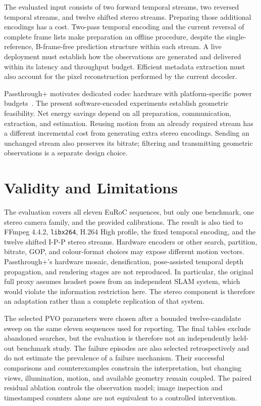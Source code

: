 The evaluated input consists of two forward temporal streams, two reversed
temporal streams, and twelve shifted stereo streams. Preparing those additional
encodings has a cost. Two-pass temporal encoding and the current reversal of
complete frame lists make preparation an offline procedure, despite the
single-reference, B-frame-free prediction structure within each stream.
A live deployment must establish how the observations are generated and
delivered within its latency and throughput budget. Efficient metadata
extraction must also account for the pixel reconstruction performed by the
current decoder.

Passthrough+ motivates dedicated codec hardware with platform-specific power
budgets~\cite{chaurasia2020passthrough}. The present software-encoded experiments
establish geometric feasibility. Net energy savings depend on all preparation,
communication, extraction, and estimation. Reusing motion from an already
required stream has a different incremental cost from generating extra stereo
encodings. Sending an unchanged stream also preserves its bitrate; filtering
and transmitting geometric observations is a separate design choice.

\section{Validity and Limitations}

The evaluation covers all eleven EuRoC sequences, but only one benchmark, one
stereo camera family, and the provided calibrations. The result is also tied to
FFmpeg 4.4.2, \texttt{libx264}, H.264 High profile, the fixed temporal encoding,
and the twelve shifted I-P-P stereo streams. Hardware encoders or other search,
partition, bitrate, GOP, and colour-format choices may expose different motion
vectors. Passthrough+'s hardware mosaic, densification, pose-assisted temporal
depth propagation, and rendering stages are not reproduced. In particular, the
original full proxy assumes headset poses from an independent SLAM system,
which would violate the information restriction here. The stereo component is
therefore an adaptation rather than a complete replication of that system.

The selected PVO parameters were chosen after a bounded twelve-candidate sweep
on the same eleven sequences used for reporting. The final tables exclude
abandoned searches, but the evaluation is therefore not an independently
held-out benchmark study. The failure episodes are also selected retrospectively
and do not estimate the prevalence of a failure mechanism. Their successful
comparisons and counterexamples constrain the interpretation, but changing
views, illumination, motion, and available geometry remain coupled. The paired
residual ablation controls the observation model; image inspection and
timestamped counters alone are not equivalent to a controlled intervention.

